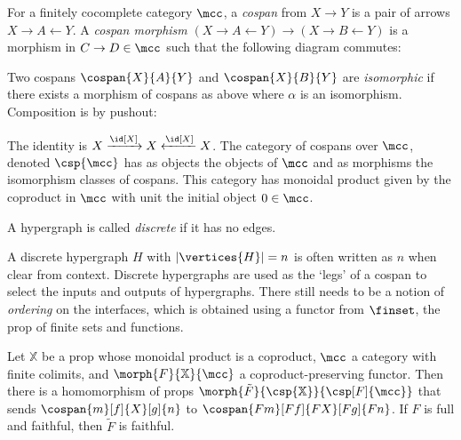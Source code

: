 \begin{definition}\label{def:cospans}
    For a finitely cocomplete category \(\mcc\), a \emph{cospan} from \(X \to Y\) is a pair of arrows \(X \to A \leftarrow Y\).
    A \emph{cospan morphism} \((X \to A \leftarrow Y) \to (X \to B \leftarrow Y)\) is a morphism in \(C \to D \in \mcc\) such that the following diagram commutes:

    \begin{center}
        
    \end{center}

    \noindent
    Two cospans \(\cospan{X}{A}{Y}\) and \(\cospan{X}{B}{Y}\) are \emph{isomorphic} if there exists a morphism of cospans as above where \(\alpha\) is an isomorphism.
    Composition is by pushout:

    \begin{center}
        
    \end{center}

    \noindent
    The identity is \(X \xrightarrow{\id[X]} X \xleftarrow{\id[X]} X\).
    The category of cospans over \(\mcc\), denoted \(\csp{\mcc}\) has as objects the objects of \(\mcc\) and as morphisms the isomorphism classes of cospans.
    This category has monoidal product given by the coproduct in \(\mcc\) with unit the initial object \(0 \in \mcc\).
\end{definition}

\begin{definition}
    A hypergraph is called \emph{discrete} if it has no edges.
\end{definition}

\noindent
A discrete hypergraph \(H\) with \(|\vertices{H}| = n\) is often written as \(n\) when clear from context.
Discrete hypergraphs are used as the `legs' of a cospan to select the inputs and outputs of hypergraphs.
There still needs to be a notion of \emph{ordering} on the interfaces, which is obtained using a functor from \(\finset\), the prop of finite sets and functions.

\begin{theorem}
    \label{thm:cospan-homomorphism}
    Let \(\mathbb{X}\) be a prop whose monoidal product is a coproduct, \(\mcc\) a category with finite colimits, and \(\morph{F}{\mathbb{X}}{\mcc}\) a coproduct-preserving functor.
    Then there is a homomorphism of props \(\morph{\tilde{F}}{\csp{\mathbb{X}}}{\csp[F]{\mcc}}\) that sends \(\cospan{m}[f]{X}[g]{n}\) to \(\cospan{Fm}[Ff]{FX}[Fg]{Fn}\).
    If \(F\) is full and faithful, then \(\tilde{F}\) is faithful.
\end{theorem}

